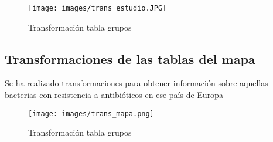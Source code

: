 \documentclass[../main.tex]{subfiles}
\begin{document}
\begin{figure}[h]
    \centering
    \texttt{[image: images/trans\_estudio.JPG]}
    \caption{Transformación tabla grupos}
    \label{transG}
\end{figure}

\newpage

\subsection{Transformaciones de las tablas del mapa}

Se ha realizado transformaciones para obtener información sobre aquellas bacterias con resistencia a antibióticos en ese país de Europa

\hfill

\begin{figure}[h]
    \centering
    \texttt{[image: images/trans\_mapa.png]}
    \caption{Transformación tabla grupos}
    \label{transMapa}
\end{figure}
\end{document}
